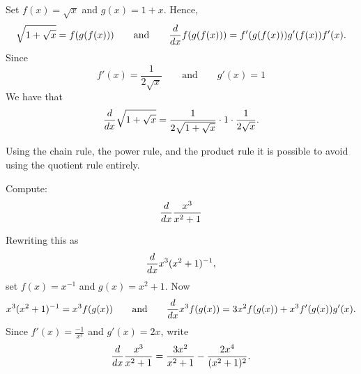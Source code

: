 \begin{solution}
Set 
$f(x)=\sqrt{x}$ and $g(x)=1+x$. Hence,
\[
\sqrt{1+\sqrt{x}}=f(g(f(x))) \qquad\text{and}\qquad\frac{d}{dx} f(g(f(x))) = f'(g(f(x)))g'(f(x))f'(x).
\]
Since 
\[
f'(x) = \frac{1}{2\sqrt{x}} \qquad\text{and}\qquad g'(x) = 1
\]
We have that
\[
\frac{d}{dx} \sqrt{1+\sqrt{x}} = \frac{1}{2\sqrt{1+\sqrt{x}}}\cdot 1\cdot  \frac{1}{2\sqrt{x}}.
\]
\end{solution}

Using the chain rule, the power rule, and the product rule it is
possible to avoid using the quotient rule entirely.

\begin{example}
Compute:
\[
\frac{d}{dx} \frac{x^3}{x^2+1}
\]
\end{example}
\begin{solution}
Rewriting this as 
\[
\frac{d}{dx} x^3(x^2+1)^{-1}, 
\]
set $f(x) = x^{-1}$ and $g(x) = x^2+1$. Now
\[
x^3(x^2+1)^{-1} = x^3 f(g(x)) \qquad\text{and}\qquad \frac{d}{dx} x^3 f(g(x)) = 3x^2f(g(x))+ x^3 f'(g(x))g'(x).
\]
Since $f'(x) = \frac{-1}{x^2}$ and $g'(x) = 2x$, write
\[
\frac{d}{dx} \frac{x^3}{x^2+1} = \frac{3x^2}{x^2+1}-\frac{2x^4}{(x^2+1)^2}.
\]
\end{solution}


